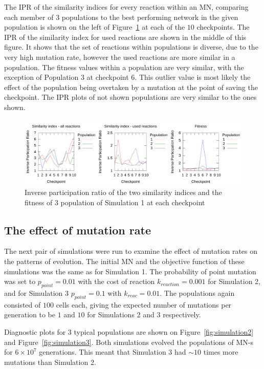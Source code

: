 \documentclass[a4paper,12pt]{article}
\begin{document}
The IPR of the similarity indices for every reaction within an MN, comparing each member of $3$ populations to the best performing network in the given population is shown on the left of Figure~\ref{fig:IPRsim1} at each of the $10$ checkpoints. The IPR of the similarity index for used reactions are shown in the middle of this figure. It shows that the set of reactions within populations is diverse, due to the very high mutation rate, however the used reactions are more similar in a population. The fitness values within a population are very similar, with the exception of Population $3$ at checkpoint $6$. This outlier value is most likely the effect of the population being overtaken by a mutation at the point of saving the checkpoint. The IPR plots of not shown populations are very similar to the ones shown. 

\begin{figure}[htpb]
	\centering
	\includegraphics[width=1\linewidth]{IPR_sim1.pdf}
	\caption{Inverse participation ratio of the two similarity indices and the fitness of $3$ population of Simulation 1 at each checkpoint}
	\label{fig:IPRsim1}
\end{figure}


\subsection{The effect of mutation rate}
\label{sub:the_probability_of_the_mutations}

The next pair of simulations were run to examine the effect of mutation rates on the patterns of evolution. The initial MN and the objective function of these simulations was the same as for Simulation 1. The probability of point mutation was set to $p_{point}=0.01$ with the cost of reaction $k_{reaction}=0.001$ for Simulation 2, and for Simulation 3 $p_{point}=0.1$ with $k_{reac}=0.01$. The populations again consisted of $100$ cells each, giving the expected number of mutations per generation to be $1$ and $10$ for Simulations 2 and 3 respectively. 

Diagnostic plots for $3$ typical populations are shown on Figure~\ref{fig:simulation2} and Figure~\ref{fig:simulation3}.
Both simulations evolved the populations of MN-s for $6\times 10^7$ generations. This meant that Simulation 3 had $\sim10$ times more mutations than Simulation 2. 
\end{document}
